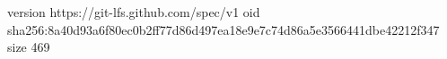 version https://git-lfs.github.com/spec/v1
oid sha256:8a40d93a6f80ec0b2ff77d86d497ea18e9e7c74d86a5e3566441dbe42212f347
size 469
